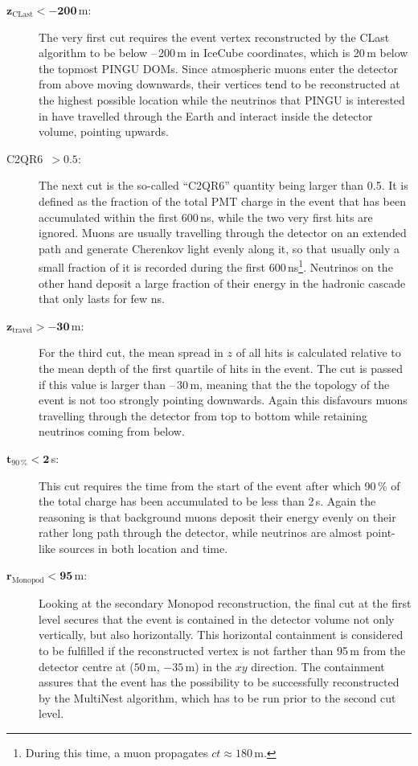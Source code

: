 \begin{description}
 \item[$\mathbf{z_\mathrm{CLast} < -200}$\,m:] The very first cut requires the
  event vertex reconstructed by the CLast algorithm to be below --\,200\,m in
  IceCube coordinates, which is 20\,m below the topmost PINGU DOMs. Since
  atmospheric muons enter the detector from above moving downwards, their
  vertices tend to be reconstructed  at the highest possible location while the
  neutrinos that PINGU is interested  in have travelled through the Earth and
  interact inside the detector volume,  pointing upwards.

\item[C2QR6\ $\mathbf{>0.5}$:] The next cut is the so-called ``C2QR6'' quantity
  being  larger than 0.5. It is defined as the fraction of the total PMT charge
  in the  event that has been accumulated within the first 600\,ns, while the
  two very  first hits are ignored. Muons are usually travelling through the
  detector on  an extended path and generate Cherenkov light evenly along it, so
  that usually  only a small fraction of it is recorded during the first
  600\,ns\footnote{During this time, a muon propagates $ct\approx180$\,m.}.
  Neutrinos on the other hand deposit a large fraction of their energy in the
  hadronic cascade that only lasts for few ns.

\item[$\mathbf{z_\mathrm{travel} > -30}$\,m:] For the third cut, the mean spread
  in $z$  of all hits is calculated relative to the mean depth of the first
  quartile of  hits in the event. The cut is passed if this value is larger than
  --\,30\,m,  meaning that the the topology of the event is not too strongly
  pointing  downwards. Again this disfavours muons travelling through the
  detector from  top to bottom while retaining neutrinos coming from below.

\item[$\mathbf{t_\mathrm{90\,\%} < 2}$\,\textmu s:] This cut requires the
  time from  the start of the event after which 90\,\% of the total charge has
  been  accumulated to be less than 2\,\textmu s. Again the reasoning is that
  background muons deposit their energy evenly on their rather long path
  through the  detector, while neutrinos are almost point-like sources in both
  location and  time.

\item[$\mathbf{r_\mathrm{Monopod} < 95}$\,m:] Looking at the secondary 
  Monopod reconstruction, the final cut at the first level secures that the
  event is contained in the detector volume not only vertically, but also
  horizontally. This horizontal containment is considered to be fulfilled if
  the reconstructed vertex is not farther than 95\,m from the detector centre
  at ($50$\,m, $-35$\,m) in the $xy$ direction. The containment assures that
  the event has the possibility to be successfully reconstructed by the
  MultiNest algorithm, which has to be run prior to the second cut level.
\end{description}



